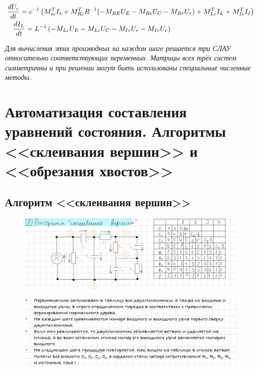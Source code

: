 	\begin{equation}
		\begin{aligned}
			\frac{dU_c}{dt} &= c^{-1}\left(M_{sc}^T I_s + M_{Rc}^T R^{-1} (-M_{RE} U_E - M_{Re} U_C - M_{Rr} U_r) + M_{Lc}^T I_L + M_{Ic}^T I_I\right) \\
			&\hspace{-1em}\frac{dI_L}{dt} = L^{-1}\left(-M_{Lc} U_E - M_{Lc} U_C - M_{Ir} U_r - M_{Ir} U_r\right)
		\end{aligned}
	\end{equation}
	
	\vspace{1em}
	\noindent\textit{Для вычисления этих производных на каждом шаге решается три СЛАУ относительно соответствующих переменных. Матрицы всех трёх систем симметричны и при решении могут быть использованы специальные численные методы.}
	
	\newpage
	
	\section{Автоматизация составления уравнений состояния. Алгоритмы <<склеивания вершин>> и <<обрезания хвостов>>}
	
	\subsection{Алгоритм <<склеивания вершин>>}
	
	\begin{figure}[H]
		\centering
		\includegraphics[width=1\linewidth, height=0.2\textheight]{img/25_01}
		\label{fig:25_01}
	\end{figure}
	
	\begin{figure}[H]
		\centering
		\includegraphics[width=1\linewidth, height=0.2\textheight]{img/25_02}
		\label{fig:25_02}
	\end{figure}
	
